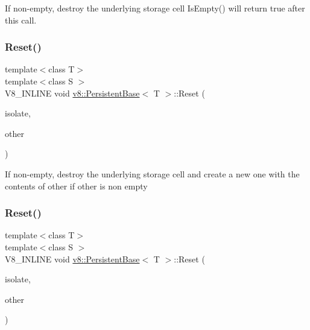 If non-\/empty, destroy the underlying storage cell Is\+Empty() will return true after this call. \mbox{\label{classv8_1_1PersistentBase_a11164f0dfc9a16d79809236e7a9670aa}} 
\subsubsection{\texorpdfstring{Reset()}{Reset()}\hspace{0.1cm}{\footnotesize\ttfamily [2/3]}}
{\footnotesize\ttfamily template$<$class T$>$ \\
template$<$class S $>$ \\
V8\+\_\+\+I\+N\+L\+I\+NE void \mbox{\hyperlink{classv8_1_1PersistentBase}{v8\+::\+Persistent\+Base}}$<$ T $>$\+::Reset (\begin{DoxyParamCaption}\item[{\mbox{\hyperlink{classv8_1_1Isolate}{Isolate}} $\ast$}]{isolate,  }\item[{const \mbox{\hyperlink{classv8_1_1Local}{Local}}$<$ S $>$ \&}]{other }\end{DoxyParamCaption})}

If non-\/empty, destroy the underlying storage cell and create a new one with the contents of other if other is non empty \mbox{\label{classv8_1_1PersistentBase_af6b8f929b0cbaa83341df48ca3b03ef5}} 
\subsubsection{\texorpdfstring{Reset()}{Reset()}\hspace{0.1cm}{\footnotesize\ttfamily [3/3]}}
{\footnotesize\ttfamily template$<$class T$>$ \\
template$<$class S $>$ \\
V8\+\_\+\+I\+N\+L\+I\+NE void \mbox{\hyperlink{classv8_1_1PersistentBase}{v8\+::\+Persistent\+Base}}$<$ T $>$\+::Reset (\begin{DoxyParamCaption}\item[{\mbox{\hyperlink{classv8_1_1Isolate}{Isolate}} $\ast$}]{isolate,  }\item[{const \mbox{\hyperlink{classv8_1_1PersistentBase}{Persistent\+Base}}$<$ S $>$ \&}]{other }\end{DoxyParamCaption})}

